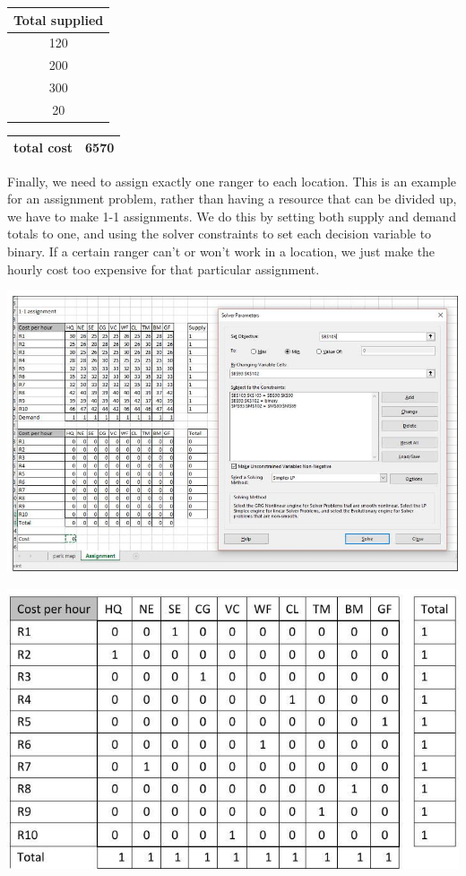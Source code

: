 \documentclass[10pt]{article}
\begin{document}
\begin{tabular}{|c|}
\hline
Total supplied \\
\hline
120 \\
\hline
200 \\
\hline
300 \\
\hline
20 \\
\hline
\end{tabular}

\begin{tabular}{|l|l|}
\hline
total cost & 6570 \\
\hline
\end{tabular}

Finally, we need to assign exactly one ranger to each location. This is an example for an assignment problem, rather than having a resource that can be divided up, we have to make 1-1 assignments. We do this by setting both supply and demand totals to one, and using the solver constraints to set each decision variable to binary. If a certain ranger can't or won't work in a location, we just make the hourly cost too expensive for that particular assignment.

\includegraphics[max width=\textwidth]{2022_07_05_5945264bba2a5f6ba667g-45}

\includegraphics[max width=\textwidth]{2022_07_05_5945264bba2a5f6ba667g-45(1)}
\end{document}
